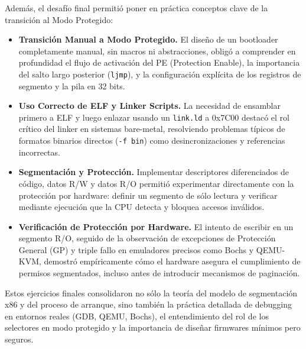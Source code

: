 Además, el desafío final permitió poner en práctica conceptos clave de la transición al Modo Protegido:

\begin{itemize}
  \item \textbf{Transición Manual a Modo Protegido.} El diseño de un bootloader completamente manual, sin macros ni abstracciones, obligó a comprender en profundidad el flujo de activación del PE (Protection Enable), la importancia del salto largo posterior (\texttt{ljmp}), y la configuración explícita de los registros de segmento y la pila en 32 bits.
  \item \textbf{Uso Correcto de ELF y Linker Scripts.} La necesidad de ensamblar primero a ELF y luego enlazar usando un \texttt{link.ld} a 0x7C00 destacó el rol crítico del linker en sistemas bare-metal, resolviendo problemas típicos de formatos binarios directos (\texttt{-f bin}) como desincronizaciones y referencias incorrectas.
  \item \textbf{Segmentación y Protección.} Implementar descriptores diferenciados de código, datos R/W y datos R/O permitió experimentar directamente con la protección por hardware: definir un segmento de sólo lectura y verificar mediante ejecución que la CPU detecta y bloquea accesos inválidos.
  \item \textbf{Verificación de Protección por Hardware.} El intento de escribir en un segmento R/O, seguido de la observación de excepciones de Protección General (GP) y triple fallo en emuladores precisos como Bochs y QEMU-KVM, demostró empíricamente cómo el hardware asegura el cumplimiento de permisos segmentados, incluso antes de introducir mecanismos de paginación.
\end{itemize}

Estos ejercicios finales consolidaron no sólo la teoría del modelo de segmentación x86 y del proceso de arranque, sino también la práctica detallada de debugging en entornos reales (GDB, QEMU, Bochs), el entendimiento del rol de los selectores en modo protegido y la importancia de diseñar firmwares mínimos pero seguros.
